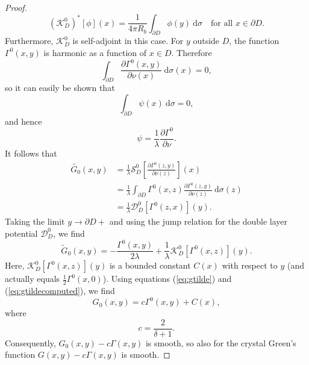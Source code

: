 \documentclass[a4paper]{article}
\theoremstyle{definition}
\renewcommand{\S}{\mathcal{S}}
\newcommand{\K}{\mathcal{K}}
\newcommand{\dx}{\: \mathrm{d}}
\newcommand{\eqnref}[1]{(\ref {#1})}
\begin{document}
\begin{proof}
\begin{equation*}
\left(\K_D^0\right)^*[\phi](x) = \frac{1}{4\pi R_b}\int_{\partial D} \phi(y)\dx \sigma \quad \text{for all } x\in \partial D.
\end{equation*}
Furthermore, $\K_D^0$ is self-adjoint in this case. For $y$ outside $D$, the function $\Gamma^0(x,y)$ is harmonic as a function of $x\in D$. Therefore 
\begin{equation*}
\int_{\partial D} \frac{\partial \Gamma^0(x,y)}{\partial \nu(x)}\dx \sigma(x) = 0,
\end{equation*}
so it can easily be shown that 
\begin{equation*}
\int_{\partial D} \psi(x)\dx \sigma = 0,
\end{equation*}
and hence 
\begin{equation*}
\psi = \frac{1}{\lambda}\frac{\partial \Gamma^0}{\partial \nu}.
\end{equation*}
It follows that 
\begin{align*}
\tilde{G_0}(x,y) &= \frac{1}{\lambda}\S_D^0 \left[\frac{\partial \Gamma^0(z,y)}{\partial \nu(z)} \right](x) \\
&= \frac{1}{\lambda} \int_{\partial D} \Gamma^0(x,z) \frac{\partial \Gamma^0(z,y)}{\partial \nu(z)} \dx \sigma(z) \\
&=\frac{1}{\lambda}\mathcal{D}_D^0 \left[\Gamma^0(z,x)\right](y).
\end{align*}
Taking the limit $y\rightarrow \partial D+$ and using the jump relation for the double layer potential $\mathcal{D}_D^0$, we find
\begin{equation} \label{eq:gtildecomputated}
\tilde{G}_0(x,y) = -\frac{\Gamma^0(x,y)}{2\lambda} + \frac{1}{\lambda}\K_D^0\left[\Gamma^0(x,z)\right](y).
\end{equation}
Here, $\K_D^0\left[\Gamma^0(x,z)\right](y)$ is a bounded constant $C(x)$ with respect to $y$ (and actually equals $\frac{1}{2}\Gamma^0(x,0)$). Using equations \eqnref{eq:gtilde} and \eqnref{eq:gtildecomputed}, we find
\begin{equation*}
G_0(x,y) = c\Gamma^0(x,y) + C(x),
\end{equation*}
where 
\begin{equation*}
c = \frac{2}{\delta+1}.
\end{equation*}
Consequently, $G_0(x,y)-c\Gamma(x,y)$ is smooth, so also for the crystal Green's function $G(x,y)-c\Gamma(x,y)$ is smooth. 


\end{proof}
\end{document}
